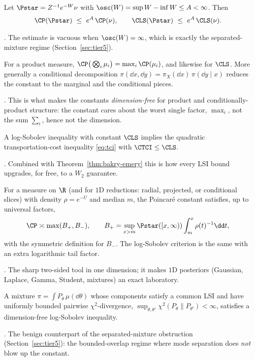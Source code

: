 \documentclass[../main.tex]{subfiles}
\begin{document}
\begin{theorem}
\label{thm:holley-stroock}
Let $\Pstar=Z^{-1}e^{-W}\nu$ with $\osc(W)=\sup W-\inf W\le A<\infty$. Then
\[
  \CP(\Pstar)\ \le\ e^{A}\,\CP(\nu),
  \qquad
  \CLS(\Pstar)\ \le\ e^{A}\,\CLS(\nu).
\]
\end{theorem}
\noindent\cite{HolleyStroock1987}. The estimate is vacuous when $\osc(W)=\infty$, which is
exactly the separated-mixture regime (Section~\ref{sec:tier5}).

\begin{theorem}[Tensorization]
\label{thm:tensorization}
For a product measure, $\CP\big(\bigotimes_i\mu_i\big)=\max_i\CP(\mu_i)$, and likewise for
$\CLS$. More generally a conditional decomposition
$\pi(\dd x,\dd y)=\pi_X(\dd x)\,\pi(\dd y\mid x)$ reduces the constant to the marginal and the
conditional pieces.
\end{theorem}
\noindent\cite{BakryGentilLedoux2014}. This is what makes the constants \emph{dimension-free}
for product and conditionally-product structure: the constant cares about the worst single
factor, $\max_i$, not the sum $\sum_i$, hence not the dimension.

\begin{theorem}
\label{thm:otto-villani}
A log-Sobolev inequality with constant $\CLS$ implies the quadratic transportation-cost
inequality \eqref{eq:tci} with $\CTCI\le\CLS$.
\end{theorem}
\noindent\cite{OttoVillani2000,Villani2008}. Combined with Theorem~\ref{thm:bakry-emery}
this is how every LSI bound upgrades, for free, to a $W_2$ guarantee.

\begin{theorem}
\label{thm:hardy-1d}
For a measure on $\R$ (and for $1$D reductions: radial, projected, or conditional slices)
with density $\rho=e^{-U}$ and median $m$, the Poincar\'e constant satisfies, up to universal
factors,
\[
  \CP\asymp\max(B_+,B_-),
  \qquad
  B_+=\sup_{x>m}\Pstar([x,\infty))\int_m^x\rho(t)^{-1}\dd t,
\]
with the symmetric definition for $B_-$. The log-Sobolev criterion is the same with an extra
logarithmic tail factor.
\end{theorem}
\noindent\cite{Muckenhoupt1972,BobkovGotze1999}. The sharp two-sided tool in one dimension;
it makes $1$D posteriors (Gaussian, Laplace, Gamma, Student, mixtures) an exact laboratory.

\begin{corollary}
\label{cor:ccnw-mixture-lsi}
A mixture $\pi=\int P_\theta\,\mu(\dd\theta)$ whose components satisfy a common LSI and have
uniformly bounded pairwise $\chi^2$-divergence,
$\sup_{\theta,\theta'}\chi^2(P_\theta\|P_{\theta'})<\infty$, satisfies a dimension-free
log-Sobolev inequality.
\end{corollary}
\noindent\cite{ChenChewiNilesWeed2021}. The benign counterpart of the separated-mixture
obstruction (Section~\ref{sec:tier5}): the bounded-overlap regime where mode separation does
\emph{not} blow up the constant.
\end{document}
